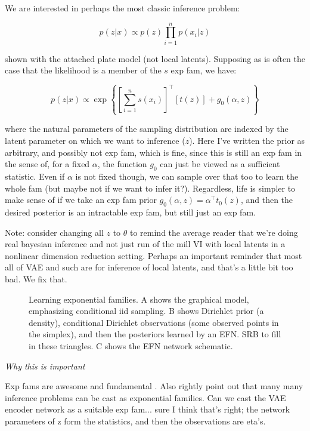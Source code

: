 \documentclass{article}
\begin{document}
 
We are interested in perhaps the most classic inference problem:

$$p(z | x) \propto p(z) \prod_{i=1}^n p(x_i | z)$$

 shown with the attached plate model (not local latents).  Supposing as is often the case that the likelihood is a member of the $s$ exp fam, we have:
 
 $$p(z | x ) \propto \exp\left\{ \left[ \sum_{i=1}^n s(x_i) \right]^\top\left[ t(z) \right] + g_0(\alpha,z) \right\}$$
 
 where the natural parameters of the sampling distribution are indexed by the latent parameter on which we want to inference ($z$).  Here I've written the prior as arbitrary, and possibly not exp fam, which is fine, since this is still an exp fam in the  sense of, for a fixed $\alpha$, the function $g_0$ can just be viewed as a sufficient statistic.  Even if $\alpha$ is not fixed though, we can sample over that too to learn the whole fam (but maybe not if we want to infer it?).  Regardless, life is simpler to make sense of if we take an exp fam prior $g_0(\alpha,z) = \alpha^\top t_0(z)$, and then the desired posterior is an intractable exp fam, but still just an exp fam.
 
 Note: consider changing all $z$ to $\theta$ to remind the average reader that we're doing real bayesian inference and not just run of the mill VI with local latents in a nonlinear dimension reduction setting.  Perhaps an important reminder that most all of VAE and such are for inference of local latents, and that's a little bit too bad.  We fix that.

\begin{figure}
  \centering

  \caption{Learning exponential families.  A shows the graphical model, emphasizing conditional iid sampling.  B shows Dirichlet prior (a density), conditional Dirichlet observations (some observed points in the simplex), and then the posteriors learned by an EFN.  SRB to fill in these triangles.   C shows the EFN network schematic.}
\end{figure}



 \emph{Why this is important}
 
Exp fams are awesome and fundamental \cite{}.  Also \cite{wainwrightjordan2008graphical} rightly point out that many many inference problems can be cast as exponential families.  Can we cast the VAE encoder network as a suitable exp fam... sure I think that's right; the network parameters of z form the statistics, and then the observations are eta's.  
 
\end{document}
